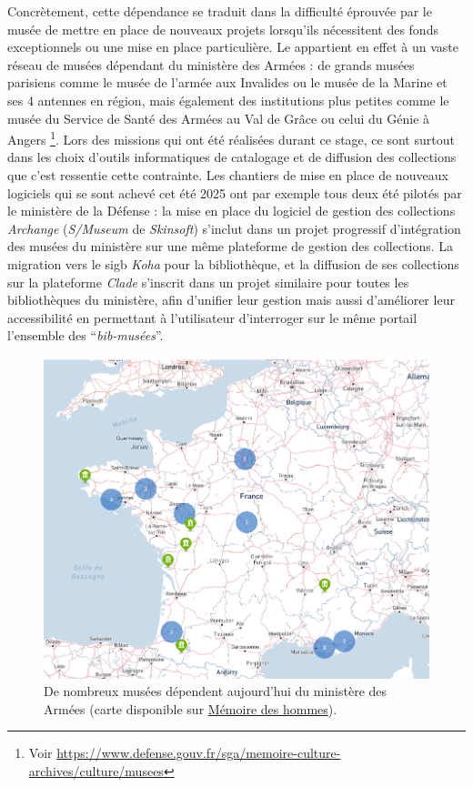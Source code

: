 Concrètement, cette dépendance se traduit dans la difficulté éprouvée par le musée de mettre en place de nouveaux projets lorsqu'ils nécessitent des fonds exceptionnels ou une mise en place particulière. Le \mae appartient en effet à un vaste réseau de musées dépendant du ministère des Armées : de grands musées parisiens comme le musée de l'armée aux Invalides ou le musée de la Marine et ses 4 antennes en région, mais également des institutions plus petites comme le musée du Service de Santé des Armées au Val de Grâce ou celui du Génie à Angers
	\footnote{Voir \url{https://www.defense.gouv.fr/sga/memoire-culture-archives/culture/musees}}. 
Lors des missions qui ont été réalisées durant ce stage, ce sont surtout dans les choix d'outils informatiques de catalogage et de diffusion des collections que c'est ressentie cette contrainte. Les chantiers de mise en place de nouveaux logiciels qui se sont achevé cet été 2025 ont par exemple tous deux été pilotés par le ministère de la Défense : la mise en place du logiciel de gestion des collections \textit{Archange} (\textit{S/Museum} de \textit{Skinsoft}) s'inclut dans un projet progressif d'intégration des musées du ministère sur une même plateforme de gestion des collections. La migration vers le \ac{sigb} \textit{Koha} pour la bibliothèque, et la diffusion de ses collections sur la plateforme \textit{Clade} s'inscrit dans un projet similaire pour toutes les bibliothèques du ministère, afin d'unifier leur gestion mais aussi d'améliorer leur accessibilité en permettant à l'utilisateur d'interroger sur le même portail l'ensemble des \enquote{\textit{bib-musées}}.


	\begin{figure}[!]
		\includegraphics[width=\linewidth]{img/CART_musees_armee.png}
		\caption{De nombreux musées dépendent aujourd'hui du ministère des Armées (carte disponible sur \href{https://www.memoiredeshommes.sga.defense.gouv.fr/musees-collections-et-mecenat/musees-et-monuments}{Mémoire des hommes}).}
		\label{fig:cart_musees}
	\end{figure}


